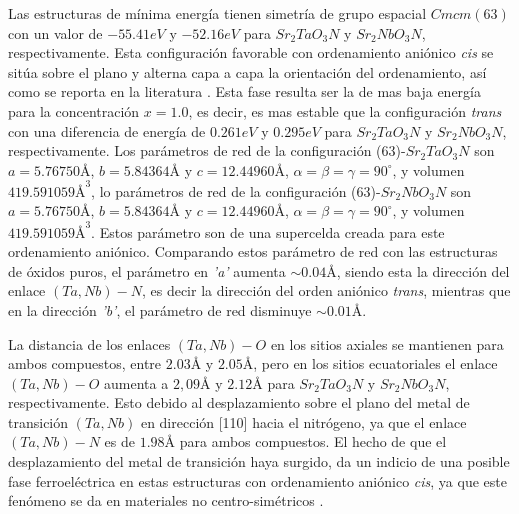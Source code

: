 Las estructuras de mínima energía tienen simetría de grupo espacial $Cmcm(63)$ con un valor de $-55.41 eV$ y $-52.16 eV$ para $Sr_{2}TaO_{3}N$ y  $Sr_{2}NbO_{3}N$, respectivamente. Esta configuración favorable con ordenamiento aniónico \emph{cis} se sitúa sobre el plano y alterna capa a capa la orientación del ordenamiento, así como se reporta en la literatura \cite{Yang2011}.  Esta fase resulta ser la de mas baja energía para la concentración $x=1.0$, es decir, es mas estable que la configuración \emph{trans} con una diferencia de energía de $0.261 eV$ y $0.295  eV$ para $Sr_{2}TaO_{3}N$ y  $Sr_{2}NbO_{3}N$, respectivamente. Los parámetros de red de la configuración ($63$)-$Sr_{2}TaO_{3}N$ son $a=5.76750 \si{\angstrom}$, $b=5.84364 \si{\angstrom}$ y $c=12.44960 \si{\angstrom}$, $\alpha=\beta=\gamma=90^{\circ}$, y volumen $419.591059 \si{\angstrom}^{3}$,  lo parámetros de red de la configuración ($63$)-$Sr_{2}NbO_{3}N$ son $a=5.76750\si{\angstrom}$, $b=5.84364 \si{\angstrom}$ y $c=12.44960 \si{\angstrom}$, $\alpha=\beta=\gamma=90^{\circ}$, y volumen $419.591059  \si{\angstrom}^{3}$. Estos parámetro son de una supercelda creada para este ordenamiento aniónico. Comparando estos parámetro de red con las estructuras de óxidos puros, el parámetro en \emph{'a'} aumenta $\sim0.04  \si{\angstrom}$, siendo esta la dirección del enlace $(Ta,Nb)-N$, es decir la dirección del orden aniónico \emph{trans}, mientras que en la dirección \emph{'b'}, el parámetro de red disminuye $\sim0.01 \si{\angstrom}$.

La distancia de los enlaces $(Ta,Nb)-O$ en los sitios axiales se mantienen para ambos compuestos, entre $2.03  \si{\angstrom}$ y $2.05  \si{\angstrom}$, pero en los sitios ecuatoriales el enlace $(Ta,Nb)-O$ aumenta a $2,09  \si{\angstrom}$ y $2.12  \si{\angstrom}$ para $Sr_{2}TaO_{3}N$ y  $Sr_{2}NbO_{3}N$, respectivamente. Esto debido al desplazamiento sobre el plano del metal de transición $(Ta,Nb)$ en dirección [110] hacia el nitrógeno, ya que el enlace $(Ta,Nb)-N$ es de $1.98  \si{\angstrom}$ para ambos compuestos. El hecho de que el desplazamiento del metal de transición haya surgido, da un indicio de una posible fase ferroeléctrica en estas estructuras con ordenamiento aniónico \emph{cis}, ya que este fenómeno se da en materiales no centro-simétricos \cite{Cohen1992Oxides}.






